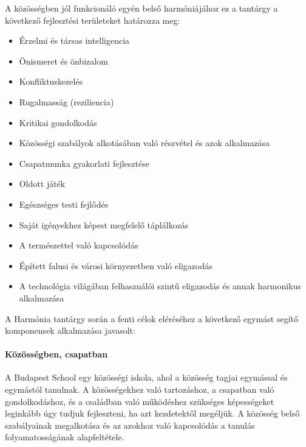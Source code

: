 A közösségben jól funkcionáló egyén belső harmóniájához ez a tantárgy a
következő fejlesztési területeket határozza meg:
\begin{itemize}
  \item Érzelmi és társas intelligencia

  \item Önismeret és önbizalom

  \item Konfliktuskezelés

  \item Rugalmasság (reziliencia)

  \item Kritikai gondolkodás

  \item Közösségi szabályok alkotásában való részvétel és azok alkalmazása

  \item Csapatmunka gyakorlati fejlesztése

  \item Oldott játék

  \item Egészséges testi fejlődés

  \item Saját igényekhez képest megfelelő táplálkozás

  \item A természettel való kapcsolódás

  \item Épített falusi és városi környezetben való eligazodás

  \item A technológia világában felhasználói szintű eligazodás és annak
        harmonikus alkalmazása
\end{itemize}

A Harmónia tantárgy során a fenti célok eléréséhez a következő egymást segítő
komponensek alkalmazása javasolt:

\paragraph{Közösségben, csapatban}

A Budapest School egy közösségi iskola, ahol a közösség tagjai egymással és
egymástól tanulnak. A közösségekhez való tartozáshoz, a csapatban való
gondolkodáshoz, és a családban való működéshez szükséges képességeket leginkább
úgy tudjuk fejleszteni, ha azt kezdetektől megéljük. A közösség belső
szabályainak megalkotása és az azokhoz való kapcsolódás a tanulás
folyamatosságának alapfeltétele.

